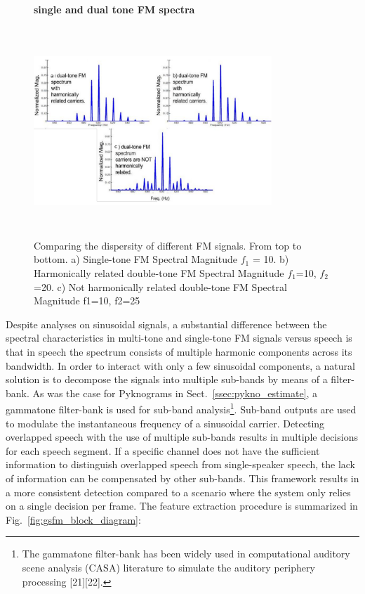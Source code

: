{\begin{figure}[h!]
	\centering
	\hspace{-1mm}
	\textbf{single and dual tone FM spectra}\par\medskip
	\includegraphics[height = 3.1in, width=0.8\textwidth]{figures/tone_FM_spectra}
	\vspace{-1mm}
	\caption{Comparing the dispersity of different FM signals.
		From top to bottom. 
		a) Single-tone FM Spectral Magnitude $f_1$ = 10. 
		b) Harmonically related double-tone FM Spectral Magnitude $f_1$=10, $f_2$=20. 
		c) Not harmonically related double-tone FM Spectral Magnitude f1=10, f2=25}
	\vspace{0mm}
	\label{fig:tone_fm_spectra}
\end{figure}

Despite analyses on sinusoidal signals, a substantial difference between the spectral characteristics in multi-tone and single-tone FM signals versus speech is that in speech the spectrum consists of multiple harmonic components across its bandwidth. 
In order to interact with only a few sinusoidal components, a natural solution is to decompose the signals into multiple sub-bands by means of a filter-bank. 
As was the case for Pyknograms in Sect.~\ref{ssec:pykno_estimate}, a gammatone filter-bank is used for sub-band analysis\footnote{The gammatone filter-bank has been widely used in computational auditory scene analysis (CASA) literature to simulate the auditory periphery processing [21][22].}. 
Sub-band outputs are used to modulate the instantaneous frequency of a sinusoidal carrier. 
Detecting overlapped speech with the use of multiple sub-bands results in multiple decisions for each speech segment. 
If a specific channel does not have the sufficient information to distinguish overlapped speech from single-speaker speech, the lack of information can be compensated by other sub-bands. 
This framework results in a more consistent detection compared to a scenario where the system only relies on a single decision per frame. 
The feature extraction procedure is summarized in Fig.~\ref{fig:gsfm_block_diagram}:

}
